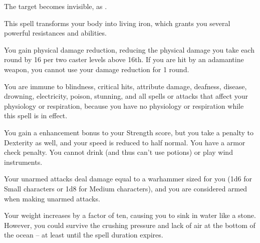 \begin{spellheader}
    \spelldur{\durshort \dismissable}
\end{spellheader}
\begin{spelleffects}
    \spelleffect The target becomes invisible, as .
\end{spelleffects}
\begin{spellfooter}

\end{spellfooter}

\begin{spellheader}
    \spelldur{\durshort \dismissable}
\end{spellheader}
\begin{spelleffects}
    \spelleffect This spell transforms your body into living iron, which grants you several powerful resistances and abilities.
    \par You gain physical damage reduction, reducing the physical damage you take each round by 16  per two caster levels above 16th. If you are hit by an adamantine weapon, you cannot use your damage reduction for 1 round.
    \par You are immune to blindness, critical hits, attribute damage, deafness, disease, drowning, electricity, poison, stunning, and all spells or attacks that affect your physiology or respiration, because you have no physiology or respiration while this spell is in effect.
    \par You gain a  enhancement bonus to your Strength score, but you take a  penalty to Dexterity as well, and your speed is reduced to half normal. You have a  armor check penalty. You cannot drink (and thus can't use potions) or play wind instruments.
    \par Your unarmed attacks deal damage equal to a warhammer sized for you (1d6 for Small characters or 1d8 for Medium characters), and you are considered armed when making unarmed attacks.
    \par Your weight increases by a factor of ten, causing you to sink in water like a stone. However, you could survive the crushing pressure and lack of air at the bottom of the ocean -- at least until the spell duration expires.
\end{spelleffects}
\begin{spellfooter}

\end{spellfooter}

